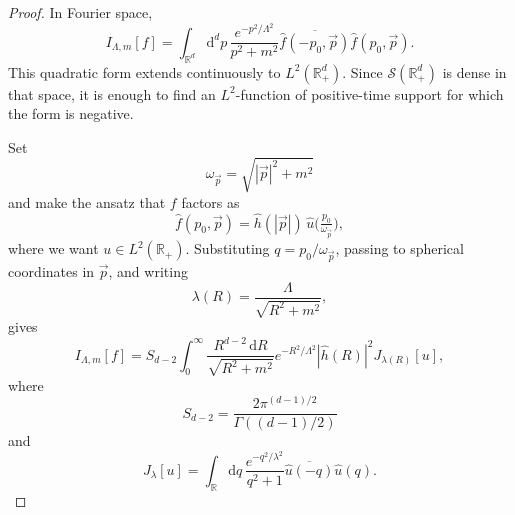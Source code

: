 \documentclass[10pt,a4paper,oneside,reqno]{amsart}
\begin{document}
\begin{appendices}
\begin{proof}
  In Fourier space,
  \begin{equation}
    I_{\Lambda,m}[f]
    =
    \int_{\mathbb R^d}\mathrm d^d p\,
    \frac{e^{-p^2/\Lambda^2}}{p^2+m^2}
    \overline{\hat f(-p_0,\vec p)}
    \hat f(p_0,\vec p).
  \end{equation}
  This quadratic form extends continuously to \(L^2(\mathbb R_+^d)\). Since
  \(\mathcal S(\mathbb R_+^d)\) is dense in that space, it is enough to find an
  \(L^2\)-function of positive-time support for which the form is negative.

  Set
  \begin{equation}
    \omega_{\vec p}=\sqrt{|\vec p|^2+m^2}
  \end{equation}
  and make the ansatz that $f$ factors as
  \begin{equation}
    \hat f(p_0,\vec p)
    =
    \hat h(|\vec p|)\,
    \hat u\!\big(\tfrac{p_0}{\omega_{\vec p}}\big),
  \end{equation}
  where we want \(u\in L^2(\mathbb R_+)\). Substituting
  \(q=p_0/\omega_{\vec p}\), passing to spherical coordinates in
  \(\vec p\), and writing
  \begin{equation}
    \lambda(R)=\frac{\Lambda}{\sqrt{R^2+m^2}},
  \end{equation}
  gives
  \begin{equation}
    I_{\Lambda,m}[f]
    =
    S_{d-2}\int_0^\infty
    \frac{R^{d-2}\,\mathrm dR}{\sqrt{R^2+m^2}}
    e^{-R^2/\Lambda^2}|\hat h(R)|^2
    J_{\lambda(R)}[u],
  \end{equation}
  where
  \begin{equation}
    S_{d-2}
    =
    \frac{2\pi^{(d-1)/2}}{\Gamma((d-1)/2)}
  \end{equation}
  and
  \begin{equation}
    J_\lambda[u]
    =
    \int_{\mathbb R}\mathrm dq\,
    \frac{e^{-q^2/\lambda^2}}{q^2+1}
    \overline{\hat u(-q)}\hat u(q).
  \end{equation}


\end{proof}
\end{appendices}
\end{document}
